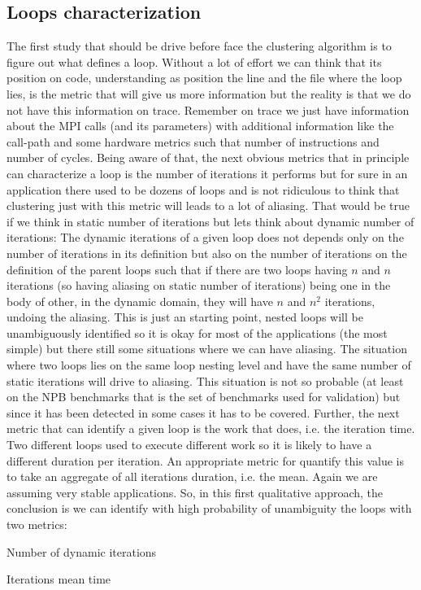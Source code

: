 \subsection{Loops characterization}

The first study that should be drive before face the clustering algorithm is to
figure out what defines a loop. Without a lot of effort we can think that its
position on code, understanding as position the line and the file where the loop
lies, is the metric that will give us more information but the reality is that 
we do not have this information on trace. Remember on trace we just have 
information about the MPI calls (and its parameters) 
with additional information like the call-path and some hardware metrics such 
that number of instructions and number of cycles. Being aware of that, the next
obvious metrics that in principle can characterize a loop is the number of
iterations it performs but for sure in an application there used to be dozens of
loops and is not ridiculous to think that clustering just with this metric will
leads to a lot of aliasing. That would be true if we think in static number of
iterations but lets think about dynamic number of iterations: The dynamic
iterations of a given loop does not depends only on the number of iterations in
its definition but also on the number of iterations on the definition of the
parent loops such that if there are two loops having $n$ and $n$ iterations (so
having aliasing on static number of iterations) being one in the body of
other, in the dynamic domain, they will have $n$ and $n^2$ iterations, undoing the aliasing.
This is just an starting point, nested loops will be unambiguously identified so
it is okay for most of the applications (the most simple) but there still some
situations where we can have aliasing. The situation where two loops
lies on the same loop nesting level and have the same number of static
iterations will drive to aliasing. This situation is not so probable (at least
on the NPB benchmarks that is the set of benchmarks used for validation) but
since it has been detected in some cases it has to be covered. Further, the next
metric that can identify a given loop is the work that does, i.e. the
iteration time. Two different loops used to execute different work so it is
likely to have a different duration per iteration. An appropriate metric for
quantify this value is to take an aggregate of all iterations duration, i.e.
the mean. Again we are assuming very stable applications. So, in this first 
qualitative approach, the conclusion is we can identify with high probability of 
unambiguity the loops with two metrics:
\begin{enumerate*}[label=\roman*)] 
  \item Number of dynamic iterations
  \item Iterations mean time
\end{enumerate*}

